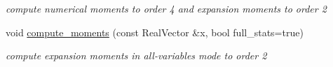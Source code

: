 \begin{DoxyCompactItemize}
\begin{DoxyCompactList}\small\item\em compute numerical moments to order 4 and expansion moments to order 2 \end{DoxyCompactList}\item 
void \hyperlink{classPecos_1_1ProjectOrthogPolyApproximation_a2a6098ab4416bdcfdeadea5d46aa5f52}{compute\+\_\+moments} (const Real\+Vector \&x, bool full\+\_\+stats=true)\label{classPecos_1_1ProjectOrthogPolyApproximation_a2a6098ab4416bdcfdeadea5d46aa5f52}

\begin{DoxyCompactList}\small\item\em compute expansion moments in all-\/variables mode to order 2 \end{DoxyCompactList}\end{DoxyCompactItemize}
